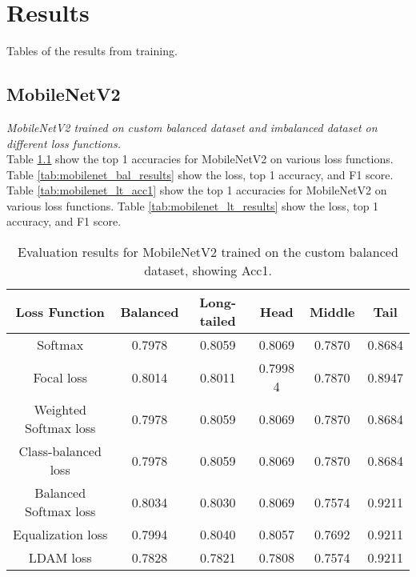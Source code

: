 \chapter{Results} %
Tables of the results from training.


\section{MobileNetV2}
\textit{MobileNetV2 trained on custom balanced dataset and imbalanced dataset on different loss functions.}\\

Table \ref{tab:mobilenet_bal_acc1} show the top 1 accuracies for MobileNetV2 on various loss functions. Table \ref{tab:mobilenet_bal_results} show the loss, top 1 accuracy, and F1 score.\\
Table \ref{tab:mobilenet_lt_acc1} show the top 1 accuracies for MobileNetV2 on various loss functions. Table \ref{tab:mobilenet_lt_results} show the loss, top 1 accuracy, and F1 score. 

\begin{table}[H]
    \centering
    \begin{tabular}{cccccc}
        \toprule
        Loss Function & Balanced & Long-tailed & Head & Middle & Tail \\ 
        \midrule
        Softmax   & 0.7978   & 0.8059 & 0.8069 & 0.7870 & 0.8684 \\
        Focal loss   & 0.8014   & 0.8011 & 0.7998 4 & 0.7870 & 0.8947 \\
        Weighted Softmax loss   & 0.7978   & 0.8059 & 0.8069 & 0.7870 & 0.8684 \\
        Class-balanced loss   & 0.7978   & 0.8059 & 0.8069 & 0.7870 & 0.8684 \\
        Balanced Softmax loss   & 0.8034  & 0.8030 & 0.8069 & 0.7574 & 0.9211 \\
        Equalization loss   & 0.7994   & 0.8040 & 0.8057 & 0.7692 & 0.9211 \\
        LDAM loss   &  0.7828   & 0.7821 & 0.7808 & 0.7574 & 0.9211 \\
        \bottomrule
    \end{tabular}
    \caption{Evaluation results for MobileNetV2 trained on the custom balanced dataset, showing Acc1.}
    \label{tab:mobilenet_bal_acc1}
\end{table}

